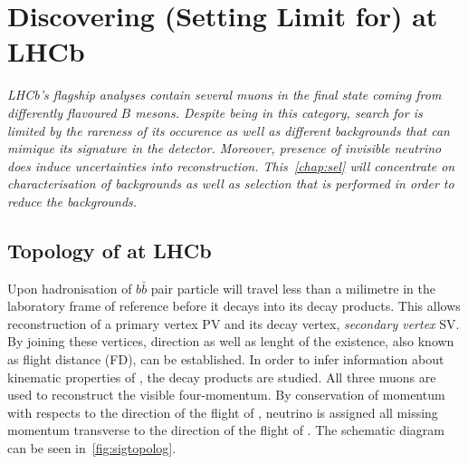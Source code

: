 
\chapter{Discovering (Setting Limit for) \boldmath{\Bmumumu} at LHCb}
\label{chap:sel}

\textit{LHCb's flagship analyses contain several muons in the final state coming from differently flavoured $B$ mesons. Despite being in this category, search for \Bmumumu is limited by the rareness of its occurence as well as different backgrounds that can mimique its signature in the detector. Moreover, presence of invisible neutrino does induce uncertainties into reconstruction. This~\autoref{chap:sel} will concentrate on characterisation of backgrounds as well as selection that is performed in order to reduce the backgrounds.}


\section{Topology of \Bmumumu at LHCb}

Upon hadronisation of $b\bar{b}$ pair \Bpm particle will travel less than a milimetre in the laboratory frame of reference before it decays into its decay products. This allows reconstruction of a primary vertex \Gls{PV} and its decay vertex, \textit{secondary vertex} \Gls{SV}. By joining these vertices, direction as well as lenght of the \Bpm existence, also known as flight distance (\Gls{FD}), can be established. In order to infer information about kinematic properties of \Bpm, the decay products are studied. All three muons are used to reconstruct the visible four-momentum. By conservation of momentum with respects to the direction of the flight of \Bpm, neutrino is assigned all missing momentum transverse to the direction of the flight of \Bpm. The schematic diagram can be seen in~\autoref{fig:sigtopolog}.



